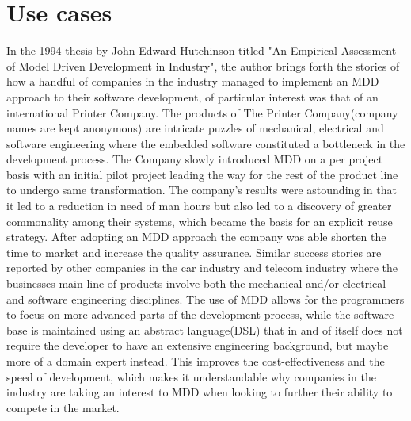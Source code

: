 \section{Use cases}
\label{usecases}

\label{Use cases}
In the 1994 thesis by John Edward Hutchinson titled "An Empirical Assessment of Model Driven Development in Industry", the author brings forth the stories of how a handful of companies in the industry managed to implement an MDD approach to their software development, of particular interest was that of an international Printer Company.
The products of The Printer Company(company names are kept anonymous) are intricate puzzles of mechanical, electrical and software engineering where the embedded software constituted a bottleneck in the development process. The Company slowly introduced MDD on a per project basis with an initial pilot project leading the way for the rest of the product line to undergo same transformation. 
The company's results were astounding in that it led to a reduction in need of man hours but also led to a discovery of greater commonality among their systems, which became the basis for an explicit reuse strategy. After adopting an MDD approach the company was able shorten the time to market and increase the quality assurance.
Similar success stories are reported by other companies in the car industry and telecom industry where the businesses main line of products involve both the mechanical and/or electrical and software engineering disciplines. The use of MDD allows for the programmers to focus on more advanced parts of the development process, while the software base is maintained using an abstract language(DSL) that in and of itself does not require the developer to have an extensive engineering background, but maybe more of a domain expert instead.
This improves the cost-effectiveness and the speed of development, which makes it understandable why companies in the industry are taking an interest to MDD when looking to further their ability to compete in the market.
